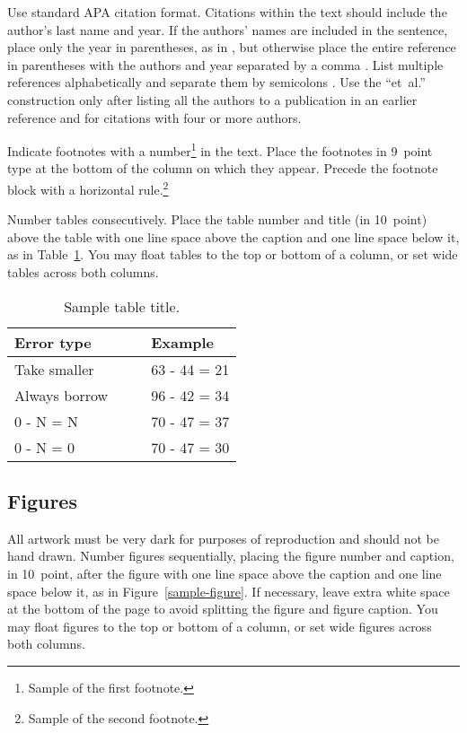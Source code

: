 \documentclass[10pt,letterpaper]{article}
\begin{document}
Use standard APA citation format. Citations within the text should
include the author's last name and year. If the authors' names are
included in the sentence, place only the year in parentheses, as in
, but otherwise place the entire reference in
parentheses with the authors and year separated by a comma
. List multiple references alphabetically and
separate them by semicolons
. Use the
``et~al.'' construction only after listing all the authors to a
publication in an earlier reference and for citations with four or
more authors.

Indicate footnotes with a number\footnote{Sample of the first
footnote.} in the text. Place the footnotes in 9~point type at the
bottom of the column on which they appear. Precede the footnote block
with a horizontal rule.\footnote{Sample of the second footnote.}

Number tables consecutively. Place the table number and title (in
10~point) above the table with one line space above the caption and
one line space below it, as in Table~\ref{sample-table}. You may float
tables to the top or bottom of a column, or set wide tables across
both columns.

\begin{table}[!ht]
\begin{center} 
\caption{Sample table title.} 
\label{sample-table} 
\vskip 0.12in
\begin{tabular}{ll} 
\hline
Error type    &  Example \\
\hline
Take smaller        &   63 - 44 = 21 \\
Always borrow~~~~   &   96 - 42 = 34 \\
0 - N = N           &   70 - 47 = 37 \\
0 - N = 0           &   70 - 47 = 30 \\
\hline
\end{tabular} 
\end{center} 
\end{table}


\subsection{Figures}

All artwork must be very dark for purposes of reproduction and should
not be hand drawn. Number figures sequentially, placing the figure
number and caption, in 10~point, after the figure with one line space
above the caption and one line space below it, as in
Figure~\ref{sample-figure}. If necessary, leave extra white space at
the bottom of the page to avoid splitting the figure and figure
caption. You may float figures to the top or bottom of a column, or
set wide figures across both columns.
\end{document}
